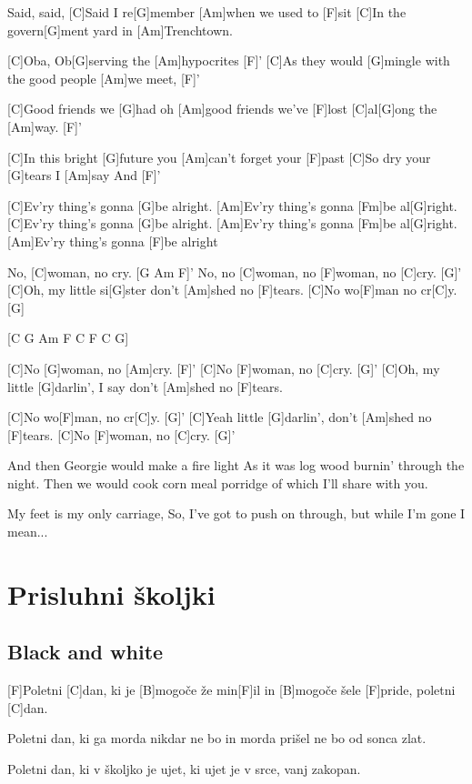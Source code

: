 \documentclass[a4paper,12pt]{article}
\begin{document}
\begin{multicols}{2}
\begin{guitar}
[G]Said, said,
[C]Said I re[G]member [Am]when we used to [F]sit
[C]In the govern[G]ment yard in [Am]Trenchtown.


[C]Oba, Ob[G]serving the [Am]hypocrites [F]'
[C]As they would [G]mingle
with the good people [Am]we meet, [F]'


[C]Good friends we [G]had oh 
[Am]good friends we've [F]lost
[C]al[G]ong the [Am]way. [F]'


[C]In this bright [G]future 
you [Am]can't forget your [F]past
[C]So dry your [G]tears I [Am]say And [F]'
  

[C]Ev'ry thing's gonna [G]be alright. 
[Am]Ev'ry thing's gonna [Fm]be al[G]right.
[C]Ev'ry thing's gonna [G]be alright.  
[Am]Ev'ry thing's gonna [Fm]be al[G]right.
[Am]Ev'ry thing's gonna [F]be alright 


No, [C]woman, no cry. [G  Am  F]'
No, no [C]woman, no [F]woman, no [C]cry. [G]'
[C]Oh, my little si[G]ster don't [Am]shed no [F]tears.
[C]No wo[F]man no cr[C]y. [G]


[C   G   Am   F   C   F   C   G]


[C]No [G]woman, no [Am]cry. [F]'
[C]No [F]woman, no [C]cry. [G]'
[C]Oh, my little [G]darlin', 
I say don't [Am]shed no [F]tears.


[C]No wo[F]man, no cr[C]y. [G]'
[C]Yeah little [G]darlin', 
don't [Am]shed no [F]tears.
[C]No [F]woman, no [C]cry. [G]'


And then Georgie would make a fire light
As it was log wood burnin' through the night.
Then we  would cook corn meal porridge
of which I'll share with you.


My feet is my only carriage,
So, I've got to push on through, 
but while I'm gone I mean...

\end{guitar}
\section{Prisluhni školjki}
\subsection*{Black and white}
\begin{guitar}

[F]Poletni [C]dan, ki je [B]mogoče že min[F]il 
in [B]mogoče šele [F]pride, poletni [C]dan. 


Poletni dan, ki ga morda nikdar ne bo 
in morda prišel ne bo od sonca zlat. 


Poletni dan, ki v školjko je ujet, 
ki ujet je v srce, vanj zakopan. 



\end{guitar}
\end{multicols}
\end{document}
